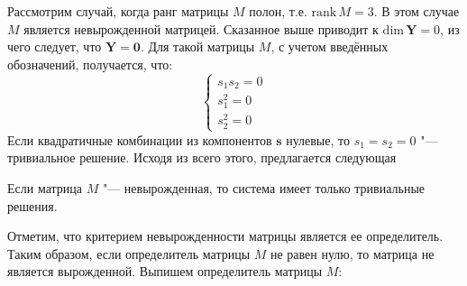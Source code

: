 Рассмотрим случай, когда ранг матрицы $M$ полон, т.е. $\textrm{rank}\,M = 3$. В этом случае $M$ 
является невырожденной матрицей. Сказанное выше приводит к $\textrm{dim}\,\mathbf{Y} = 0$, из чего 
следует, что $\mathbf{Y} = \mathbf{0}$. Для такой матрицы $M$, с учетом введённых обозначений, 
получается, что: 
$$
	\begin{cases}
		s_1 s_2 = 0 \\
		s_1 ^ 2 = 0 \\
		s_2 ^ 2 = 0
	\end{cases}
$$
Если квадратичные комбинации из компонентов $\mathbf{s}$ нулевые, то $s_1 = s_2 = 0$ "--- тривиальное 
решение. Исходя из всего этого, предлагается следующая
\begin{theorem} \label{thm:theorem_one}
Если матрица $M$ "--- невырожденная, то система имеет только тривиальные решения.
\end{theorem}
Отметим, что критерием невырожденности матрицы является ее определитель. Таким образом, если 
определитель матрицы $M$ не равен нулю, то матрица не является вырожденной. Выпишем определитель 
матрицы $M$:
